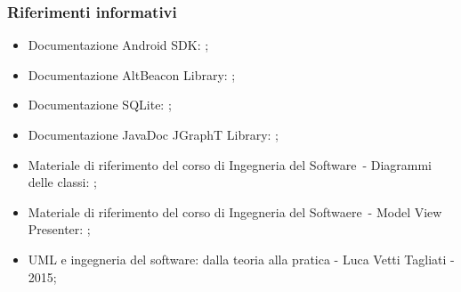 \documentclass[../DefinizioneDiProdotto.tex]{subfiles}
\begin{document}
		\subsubsection{Riferimenti informativi}
		\begin{itemize}
			\item Documentazione Android SDK: ;
			\item Documentazione AltBeacon Library: ;
			\item Documentazione SQLite: ;
			\item Documentazione JavaDoc JGraphT Library: ;
			\item Materiale di riferimento del corso di Ingegneria del Software\g\ - Diagrammi delle classi: ;
			\item Materiale di riferimento del corso di Ingegneria del Softwaere\g\ - Model View Presenter: ;
			\item UML e ingegneria del software: dalla teoria alla pratica - Luca Vetti Tagliati - 2015;
		\end{itemize}
		
\end{document}
